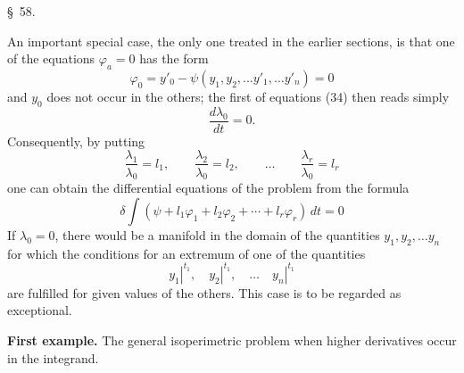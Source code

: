 \documentclass[11pt,a4paper,leqno]{article}
\begin{document}

\begin{center}
{\large \S~58.}
\end{center}

An important special case, the only one treated in the earlier sections, is that one of the equations $\varphi_a=0$ has the form
\[
\varphi_0=y'_0-\psi(y_1,y_2,\ldots y'_1,\ldots y'_n)=0
\]
and $y_0$ does not occur in the others; the first of equations (34) then reads simply
\[
\frac{d\lambda_0}{dt}=0.
\]
Consequently, by putting
\[
\frac{\lambda_1}{\lambda_0}=l_1,\qquad
\frac{\lambda_2}{\lambda_0}=l_2,\qquad\ldots\qquad
\frac{\lambda_r}{\lambda_0}=l_r
\]
one can obtain the differential equations of the problem from the formula
\[
\delta\int(\psi+l_1\varphi_1+l_2\varphi_2+\cdots+l_r\varphi_r)\,dt=0
\]
If $\lambda_0=0$, there would be a manifold in the domain of the quantities $y_1,y_2,\ldots y_n$ for which the conditions for an extremum of one of the quantities
\[
\left.y_1\right|^{t_1},\quad
\left.y_2\right|^{t_1},\quad\ldots\quad
\left.y_n\right|^{t_1}
\]
are fulfilled for given values of the others. This case is to be regarded as exceptional.

\noindent\textbf{First example.} The general isoperimetric problem when higher derivatives occur in the integrand.
\end{document}
